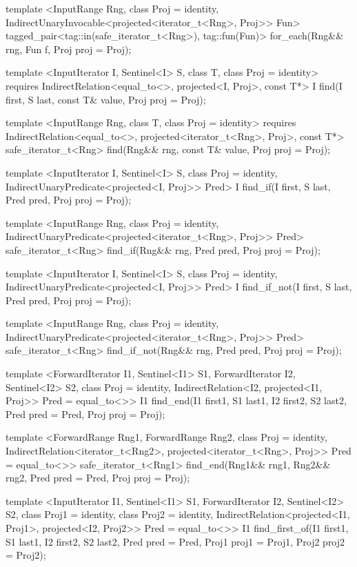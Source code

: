 {\begin{codeblock}
{{    template <InputRange Rng, class Proj = identity,
        IndirectUnaryInvocable<projected<iterator_t<Rng>, Proj>> Fun>
      tagged_pair<tag::in(safe_iterator_t<Rng>), tag::fun(Fun)>
        for_each(Rng&& rng, Fun f, Proj proj = Proj{});

    template <InputIterator I, Sentinel<I> S, class T, class Proj = identity>
      requires IndirectRelation<equal_to<>, projected<I, Proj>, const T*>
      I find(I first, S last, const T& value, Proj proj = Proj{});

    template <InputRange Rng, class T, class Proj = identity>
      requires IndirectRelation<equal_to<>, projected<iterator_t<Rng>, Proj>, const T*>
      safe_iterator_t<Rng>
        find(Rng&& rng, const T& value, Proj proj = Proj{});

    template <InputIterator I, Sentinel<I> S, class Proj = identity,
        IndirectUnaryPredicate<projected<I, Proj>> Pred>
      I find_if(I first, S last, Pred pred, Proj proj = Proj{});

    template <InputRange Rng, class Proj = identity,
        IndirectUnaryPredicate<projected<iterator_t<Rng>, Proj>> Pred>
      safe_iterator_t<Rng>
        find_if(Rng&& rng, Pred pred, Proj proj = Proj{});

    template <InputIterator I, Sentinel<I> S, class Proj = identity,
        IndirectUnaryPredicate<projected<I, Proj>> Pred>
      I find_if_not(I first, S last, Pred pred, Proj proj = Proj{});

    template <InputRange Rng, class Proj = identity,
        IndirectUnaryPredicate<projected<iterator_t<Rng>, Proj>> Pred>
      safe_iterator_t<Rng>
        find_if_not(Rng&& rng, Pred pred, Proj proj = Proj{});

    template <ForwardIterator I1, Sentinel<I1> S1, ForwardIterator I2,
        Sentinel<I2> S2, class Proj = identity,
        IndirectRelation<I2, projected<I1, Proj>> Pred = equal_to<>>
      I1
        find_end(I1 first1, S1 last1, I2 first2, S2 last2,
                Pred pred = Pred{}, Proj proj = Proj{});

    template <ForwardRange Rng1, ForwardRange Rng2, class Proj = identity,
        IndirectRelation<iterator_t<Rng2>,
          projected<iterator_t<Rng>, Proj>> Pred = equal_to<>>
      safe_iterator_t<Rng1>
        find_end(Rng1&& rng1, Rng2&& rng2, Pred pred = Pred{}, Proj proj = Proj{});

    template <InputIterator I1, Sentinel<I1> S1, ForwardIterator I2, Sentinel<I2> S2,
        class Proj1 = identity, class Proj2 = identity,
        IndirectRelation<projected<I1, Proj1>, projected<I2, Proj2>> Pred = equal_to<>>
      I1
        find_first_of(I1 first1, S1 last1, I2 first2, S2 last2,
                      Pred pred = Pred{},
                      Proj1 proj1 = Proj1{}, Proj2 proj2 = Proj2{});

}}
\end{codeblock}}
